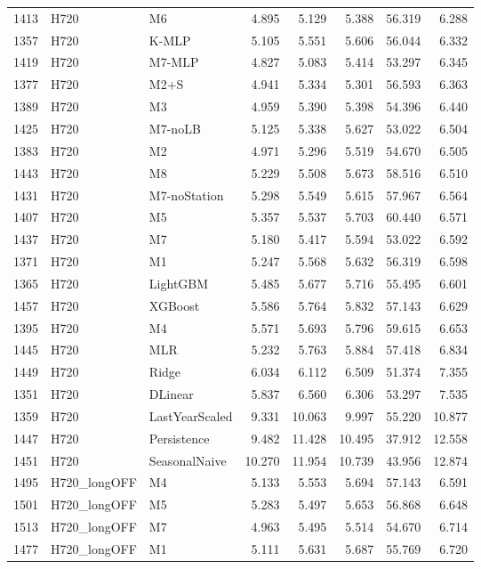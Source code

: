 \begin{tabular}{lllrrrrr}
1413 & H720 & M6 & 4.895 & 5.129 & 5.388 & 56.319 & 6.288 \\
1357 & H720 & K-MLP & 5.105 & 5.551 & 5.606 & 56.044 & 6.332 \\
1419 & H720 & M7-MLP & 4.827 & 5.083 & 5.414 & 53.297 & 6.345 \\
1377 & H720 & M2+S & 4.941 & 5.334 & 5.301 & 56.593 & 6.363 \\
1389 & H720 & M3 & 4.959 & 5.390 & 5.398 & 54.396 & 6.440 \\
1425 & H720 & M7-noLB & 5.125 & 5.338 & 5.627 & 53.022 & 6.504 \\
1383 & H720 & M2 & 4.971 & 5.296 & 5.519 & 54.670 & 6.505 \\
1443 & H720 & M8 & 5.229 & 5.508 & 5.673 & 58.516 & 6.510 \\
1431 & H720 & M7-noStation & 5.298 & 5.549 & 5.615 & 57.967 & 6.564 \\
1407 & H720 & M5 & 5.357 & 5.537 & 5.703 & 60.440 & 6.571 \\
1437 & H720 & M7 & 5.180 & 5.417 & 5.594 & 53.022 & 6.592 \\
1371 & H720 & M1 & 5.247 & 5.568 & 5.632 & 56.319 & 6.598 \\
1365 & H720 & LightGBM & 5.485 & 5.677 & 5.716 & 55.495 & 6.601 \\
1457 & H720 & XGBoost & 5.586 & 5.764 & 5.832 & 57.143 & 6.629 \\
1395 & H720 & M4 & 5.571 & 5.693 & 5.796 & 59.615 & 6.653 \\
1445 & H720 & MLR & 5.232 & 5.763 & 5.884 & 57.418 & 6.834 \\
1449 & H720 & Ridge & 6.034 & 6.112 & 6.509 & 51.374 & 7.355 \\
1351 & H720 & DLinear & 5.837 & 6.560 & 6.306 & 53.297 & 7.535 \\
1359 & H720 & LastYearScaled & 9.331 & 10.063 & 9.997 & 55.220 & 10.877 \\
1447 & H720 & Persistence & 9.482 & 11.428 & 10.495 & 37.912 & 12.558 \\
1451 & H720 & SeasonalNaive & 10.270 & 11.954 & 10.739 & 43.956 & 12.874 \\
1495 & H720_longOFF & M4 & 5.133 & 5.553 & 5.694 & 57.143 & 6.591 \\
1501 & H720_longOFF & M5 & 5.283 & 5.497 & 5.653 & 56.868 & 6.648 \\
1513 & H720_longOFF & M7 & 4.963 & 5.495 & 5.514 & 54.670 & 6.714 \\
1477 & H720_longOFF & M1 & 5.111 & 5.631 & 5.687 & 55.769 & 6.720 \\

\end{tabular}

